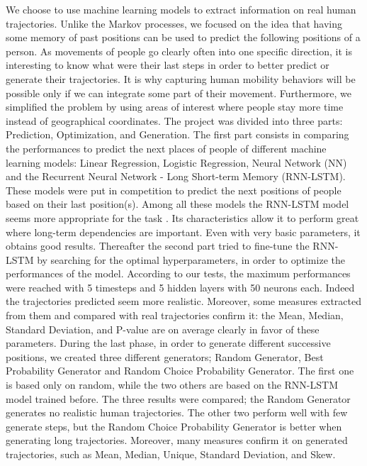 \documentclass[a4]{article}
\begin{document}
We choose to use machine learning models to extract information on real human trajectories. Unlike the Markov processes, we focused on the idea that having some memory of past positions can be used to predict the following positions of a person. As movements of people go clearly often into one specific direction, it is interesting to know what were their last steps in order to better predict or generate their trajectories. It is why capturing human mobility behaviors will be possible only if we can integrate some part of their movement. Furthermore, we simplified the problem by using areas of interest where people stay more time instead of geographical coordinates. The project was divided into three parts: Prediction, Optimization, and Generation. 
The first part consists in comparing the performances to predict the next places of people of different machine learning models: Linear Regression, Logistic Regression, Neural Network (NN) and the Recurrent Neural Network - Long Short-term Memory (RNN-LSTM). These models were put in competition to predict the next positions of people based on their last position(s). Among all these models the RNN-LSTM model seems more appropriate for the task \cite{kulkarni}. Its characteristics allow it to perform great where long-term dependencies are important. Even with very basic parameters, it obtains good results. 
Thereafter the second part tried to fine-tune the RNN-LSTM by searching for the optimal hyperparameters, in order to optimize the performances of the model. According to our tests, the maximum performances were reached with 5 timesteps and 5 hidden layers with 50 neurons each. Indeed the trajectories predicted seem more realistic. Moreover, some measures extracted from them and compared with real trajectories confirm it: the Mean, Median, Standard Deviation, and P-value are on average clearly in favor of these parameters.
During the last phase, in order to generate different successive positions, we created three different generators; Random Generator, Best Probability Generator and Random Choice Probability Generator. The first one is based only on random, while the two others are based on the RNN-LSTM model trained before. The three results were compared; the Random Generator generates no realistic human trajectories. The other two perform well with few generate steps, but the Random Choice Probability Generator is better when generating long trajectories. Moreover, many measures confirm it on generated trajectories, such as Mean, Median, Unique, Standard Deviation, and Skew.
\end{document}
